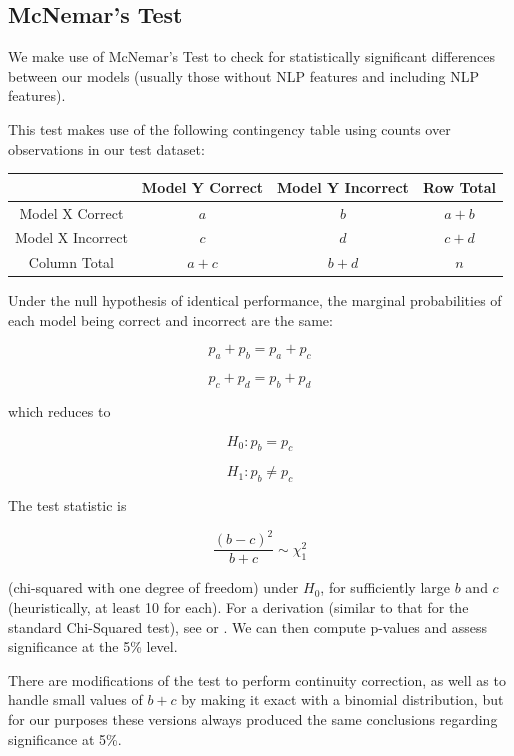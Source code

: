 \documentclass{article}[11pt]
\begin{document}
    \clearpage
    \newpage

    \subsection{McNemar's Test}

    \label{sec:mcnemars-test}

    We make use of McNemar's Test to check for statistically significant differences between our models (usually those without NLP features and including NLP features).

    This test makes use of the following contingency table using counts over observations in our test dataset:

    \begin{center}
        \begin{tabular}{|c|c|c|c|}
            \hline 
                & Model Y Correct & Model Y Incorrect & Row Total\tabularnewline
            \hline 
            \hline 
            Model X Correct & $a$ & $b$ & $a+b$\tabularnewline
            \hline 
            Model X Incorrect & $c$ & $d$ & $c+d$\tabularnewline
            \hline 
            Column Total & $a+c$ & $b+d$ & $n$\tabularnewline
            \hline 
        \end{tabular}
    \par\end{center}

    Under the null hypothesis of identical performance, the marginal probabilities of each model being correct and incorrect are the same: 

    \[
    p_{a}+p_{b}=p_{a}+p_{c}
    \]

    \[
    p_{c}+p_{d}=p_{b}+p_{d}
    \]

    which reduces to

    \[
    H_{0}:p_{b}=p_{c}
    \]

    \[
    H_{1}:p_{b}\neq p_{c}
    \]

    The test statistic is

    \[
    \frac{(b-c)^{2}}{b+c}\sim\chi_{1}^{2}
    \]

    (chi-squared with one degree of freedom) under $H_{0}$, for sufficiently large $b$ and $c$ (heuristically, at least 10 for each). For a derivation (similar to that for the standard Chi-Squared test), see \cite{mcnemar_note_1947} or \cite{rice_mathematical_2006}. We can then compute p-values and assess significance at the 5\% level.

    There are modifications of the test to perform continuity correction, as well as to handle small values of $b+c$ by making it exact with a binomial distribution, but for our purposes these versions always produced the same conclusions regarding significance at 5\%.
\end{document}
